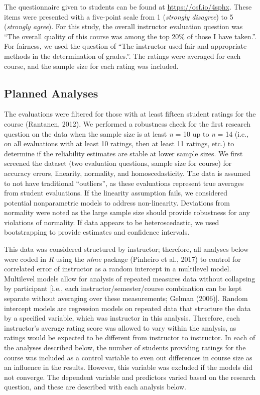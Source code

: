 \documentclass[
  man]{apa7}
\begin{document}
The questionnaire given to students can be found at
\url{https://osf.io/4sphx}. These items were presented with a five-point
scale from 1 (\emph{strongly disagree}) to 5 (\emph{strongly agree}). For this
study, the overall instructor evaluation question was ``The overall
quality of this course was among the top 20\% of those I have taken.''.
For fairness, we used the question of ``The instructor used fair and
appropriate methods in the determination of grades.''. The ratings were
averaged for each course, and the sample size for each rating was
included.

\hypertarget{planned-analyses}{%
\subsection{Planned Analyses}\label{planned-analyses}}

The evaluations were filtered for those with at least fifteen student
ratings for the course (Rantanen, 2012). We performed a robustness check
for the first research question on the data when the sample size is at
least \emph{n} = 10 up to \emph{n} = 14 (i.e., on all evaluations with at least 10
ratings, then at least 11 ratings, etc.) to determine if the reliability
estimates are stable at lower sample sizes. We first screened the
dataset (two evaluation questions, sample size for course) for accuracy
errors, linearity, normality, and homoscedasticity. The data is assumed
to not have traditional ``outliers'', as these evaluations represent true
averages from student evaluations. If the linearity assumption fails, we
considered potential nonparametric models to address non-linearity.
Deviations from normality were noted as the large sample size should
provide robustness for any violations of normality. If data appears to
be heteroscedastic, we used bootstrapping to provide estimates and
confidence intervals.

This data was considered structured by instructor; therefore, all
analyses below were coded in \emph{R} using the \emph{nlme} package
(Pinheiro et al., 2017) to control for correlated error of instructor as a
random intercept in a multilevel model. Multilevel models allow for
analysis of repeated measures data without collapsing by participant
{[}i.e., each instructor/semester/course combination can be kept separate
without averaging over these measurements; Gelman (2006){]}. Random
intercept models are regression models on repeated data that structure
the data by a specified variable, which was instructor in this analysis.
Therefore, each instructor's average rating score was allowed to vary
within the analysis, as ratings would be expected to be different from
instructor to instructor. In each of the analyses described below, the
number of students providing ratings for the course was included as a
control variable to even out differences in course size as an influence
in the results. However, this variable was excluded if the models did
not converge. The dependent variable and predictors varied based on the
research question, and these are described with each analysis below.
\end{document}
